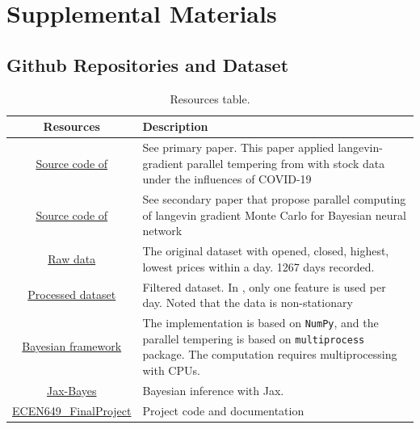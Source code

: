 \documentclass{article}
\newcommand{\beginsupplement}{%
        \setcounter{table}{0}
        \renewcommand{\thetable}{S\arabic{table}}%
        \setcounter{figure}{0}
        \renewcommand{\thefigure}{S\arabic{figure}}%
        \setcounter{section}{0}
        \renewcommand{\thesection}{S\arabic{section}}%
        \setcounter{equation}{0}
        \renewcommand{\theequation}{S\arabic{equation}}%
     }
\begin{document}
\beginsupplement
\section{Supplemental Materials}

\subsection{Github Repositories and Dataset}

\begin{table}[h]
    \centering
    \begin{tabularx}{\textwidth}{cX}
       \textbf{Resources} & \textbf{Description} \\
       \hline
       \href{https://github.com/sydney-machine-learning/Bayesianneuralnet_stockmarket}{Source code  of \citep{chandra2021bayesian}} & See primary paper\citep{chandra2021bayesian}. This paper applied langevin-gradient parallel tempering from \citep{chandra2019langevin} with stock data under the influences of COVID-19\\\hline
       \href{https://github.com/sydney-machine-learning/parallel-tempering-neural-net}{Source code of \citep{chandra2019langevin}} & See secondary paper\citep{chandra2019langevin} that propose parallel computing of langevin gradient Monte Carlo for Bayesian neural network\\\hline
        \href{https://github.com/sydney-machine-learning/Bayesianneuralnet_stockmarket/blob/master/code/datasets/raw/DAI.DE.csv}{Raw data}  & The original dataset with opened, closed, highest, lowest prices within a day. 1267 days recorded.  \\\hline
       \href{https://github.com/sydney-machine-learning/Bayesianneuralnet_stockmarket/blob/master/code/datasets/600118.SS_1_train.txt}{Processed dataset}  & Filtered dataset. In \cite{chandra2021bayesian}, only one feature is used per day. Noted that the data is non-stationary  \\\hline
       \href{https://github.com/sydney-machine-learning/Bayesianneuralnet_stockmarket/blob/6d24cf25115b6517e3099249bc657674f6b9b98f/code/pt_timeseries_regression.py\#L36-L142}{Bayesian framework} & The implementation is based on \texttt{NumPy}, and the parallel tempering is based on \texttt{multiprocess} package. The computation requires multiprocessing with CPUs.\\\hline
       \href{https://github.com/jamesvuc/jax-bayes}{Jax-Bayes} & Bayesian inference with Jax\citep{jax2018github}.\\\hline
       \href{https://github.com/stevengogogo/ECEN649_FinalProject}{ECEN649\_FinalProject} & Project code and documentation
    \end{tabularx}
    \caption{Resources table.}
    \label{tab:my_label}
\end{table}
\end{document}
